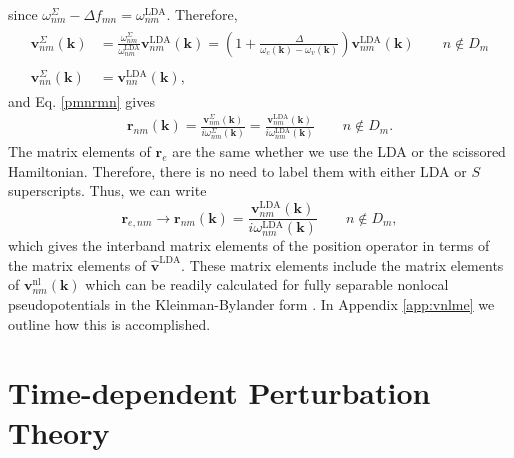 since $\omega^\Sigma_{nm}-\Delta f_{mn}=\omega^{\mathrm{LDA}}_{nm}$. Therefore,
\begin{align}\label{chon.9}
\begin{split}
\mathbf{v}^\Sigma_{nm}(\mathbf{k}) &=
\frac{\omega^\Sigma_{nm}}{\omega^{\mathrm{LDA}}_{nm}}
\mathbf{v}^\mathrm{LDA}_{nm}(\mathbf{k})
= \left(
1 + \frac{\Delta}{\omega_c(\mathbf{k})-\omega_v(\mathbf{k})}
\right)
\mathbf{v}^\mathrm{LDA}_{nm}(\mathbf{k})\qquad n\notin D_{m}\\\\
\mathbf{v}^\Sigma_{nn}(\mathbf{k}) &= \mathbf{v}^\mathrm{LDA}_{nn}(\mathbf{k}),
\end{split}
\end{align} 
and Eq. \eqref{pmnrmn} gives
\begin{align}\label{chon.10}
\mathbf{r}_{nm}(\mathbf{k})
= \frac{\mathbf{v}^\Sigma_{nm}(\mathbf{k})}{i\omega^\Sigma_{nm}(\mathbf{k})}
= \frac{\mathbf{v}^\mathrm{LDA}_{nm}(\mathbf{k})}
{i\omega^{\mathrm{LDA}}_{nm}(\mathbf{k})} \qquad n\notin D_{m}.
\end{align}
The matrix elements of $\mathbf{r}_{e}$ are the same whether we use the LDA or
the scissored Hamiltonian. Therefore, there is no need to label them with either
LDA or $S$ superscripts. Thus, we can write
\begin{equation}\label{chon.98}
\mathbf{r}_{e,nm}\to\mathbf{r}_{nm}(\mathbf{k}) =
\frac{\mathbf{v}^\mathrm{LDA}_{nm}(\mathbf{k})}
     {i\omega^{\mathrm{LDA}}_{nm}(\mathbf{k})}
\qquad n\notin D_{m},
\end{equation}   
which gives the interband matrix elements of the position operator in terms of
the matrix elements of $\hat{\mathbf{v}}^\mathrm{LDA}$. These matrix elements
include the matrix elements of $\mathbf{v}^{\mathrm{nl}}_{nm}(\mathbf{k})$ which
can be readily calculated for fully separable nonlocal pseudopotentials in the
Kleinman-Bylander form \cite{mottaCMS10, kleinmanPRL82, adolphPRB96}. In
Appendix \ref{app:vnlme} we outline how this is accomplished.



\section{Time-dependent Perturbation Theory}\label{tdpt}

